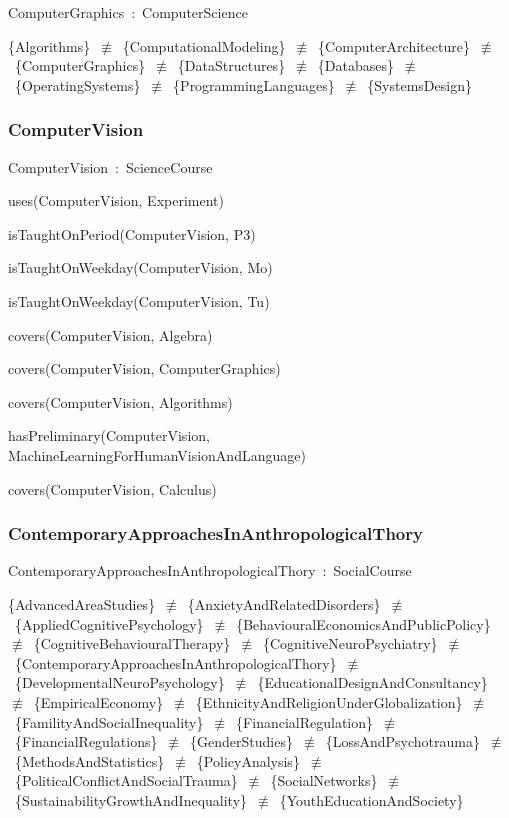\documentclass{article}
\begin{document}
ComputerGraphics~:~ComputerScience

\{Algorithms\}~\ensuremath{\not\equiv}~\{ComputationalModeling\}~\ensuremath{\not\equiv}~\{ComputerArchitecture\}~\ensuremath{\not\equiv}~\{ComputerGraphics\}~\ensuremath{\not\equiv}~\{DataStructures\}~\ensuremath{\not\equiv}~\{Databases\}~\ensuremath{\not\equiv}~\{OperatingSystems\}~\ensuremath{\not\equiv}~\{ProgrammingLanguages\}~\ensuremath{\not\equiv}~\{SystemsDesign\}

\subsubsection*{ComputerVision}

ComputerVision~:~ScienceCourse

uses(ComputerVision, Experiment)

isTaughtOnPeriod(ComputerVision, P3)

isTaughtOnWeekday(ComputerVision, Mo)

isTaughtOnWeekday(ComputerVision, Tu)

covers(ComputerVision, Algebra)

covers(ComputerVision, ComputerGraphics)

covers(ComputerVision, Algorithms)

hasPreliminary(ComputerVision, MachineLearningForHumanVisionAndLanguage)

covers(ComputerVision, Calculus)

\subsubsection*{ContemporaryApproachesInAnthropologicalThory}

ContemporaryApproachesInAnthropologicalThory~:~SocialCourse

\{AdvancedAreaStudies\}~\ensuremath{\not\equiv}~\{AnxietyAndRelatedDisorders\}~\ensuremath{\not\equiv}~\{AppliedCognitivePsychology\}~\ensuremath{\not\equiv}~\{BehaviouralEconomicsAndPublicPolicy\}~\ensuremath{\not\equiv}~\{CognitiveBehaviouralTherapy\}~\ensuremath{\not\equiv}~\{CognitiveNeuroPsychiatry\}~\ensuremath{\not\equiv}~\{ContemporaryApproachesInAnthropologicalThory\}~\ensuremath{\not\equiv}~\{DevelopmentalNeuroPsychology\}~\ensuremath{\not\equiv}~\{EducationalDesignAndConsultancy\}~\ensuremath{\not\equiv}~\{EmpiricalEconomy\}~\ensuremath{\not\equiv}~\{EthnicityAndReligionUnderGlobalization\}~\ensuremath{\not\equiv}~\{FamilityAndSocialInequality\}~\ensuremath{\not\equiv}~\{FinancialRegulation\}~\ensuremath{\not\equiv}~\{FinancialRegulations\}~\ensuremath{\not\equiv}~\{GenderStudies\}~\ensuremath{\not\equiv}~\{LossAndPsychotrauma\}~\ensuremath{\not\equiv}~\{MethodsAndStatistics\}~\ensuremath{\not\equiv}~\{PolicyAnalysis\}~\ensuremath{\not\equiv}~\{PoliticalConflictAndSocialTrauma\}~\ensuremath{\not\equiv}~\{SocialNetworks\}~\ensuremath{\not\equiv}~\{SustainabilityGrowthAndInequality\}~\ensuremath{\not\equiv}~\{YouthEducationAndSociety\}
\end{document}

